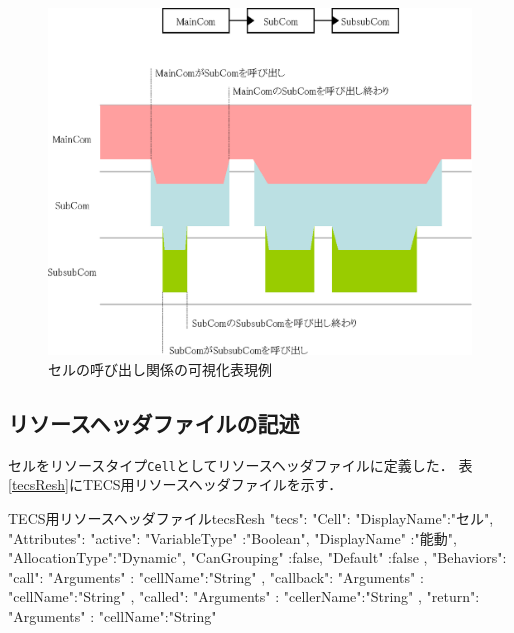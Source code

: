 \begin{figure}[t]
\begin{center}
\includegraphics[scale=0.8]{img/tecsVisualize.eps}
\caption{セルの呼び出し関係の可視化表現例}
\label{fig:tecsVisualize}
\end{center}
\end{figure}

\subsection{リソースヘッダファイルの記述}

セルをリソースタイプ{\tt Cell}としてリソースヘッダファイルに定義した．
表\ref{tecsResh}にTECS用リソースヘッダファイルを示す．

\begin{File}{TECS用リソースヘッダファイル}{tecsResh}
{
  "tecs":
  {
    "Cell":{
      "DisplayName":"セル",
      "Attributes":{
        "active":{
          "VariableType"  :"Boolean",
          "DisplayName"   :"能動",
          "AllocationType":"Dynamic",
          "CanGrouping"   :false,
          "Default"       :false
        }
      },
      "Behaviors":{
        "call":{
          "Arguments" :{
            "cellName":"String"
          }
        },
        "callback":{
          "Arguments" :{
            "cellName":"String"
          }
        },
        "called":{
          "Arguments"   :{
            "cellerName":"String"
          }
        },
        "return":{
          "Arguments" :{
            "cellName":"String"
          }
        }
      }
    }
  }
}
\end{File}

